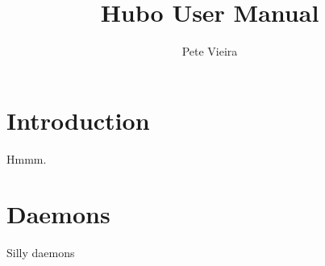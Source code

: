\documentclass[letterpaper, 10 pt]{report}
\begin{document}
\title{Hubo User Manual}
\author{Pete Vieira}
\maketitle
\pagestyle{empty}

\tableofcontents
\newpage

\section{Introduction}
Hmmm.
\newpage

\section{Daemons}
Silly daemons
\newpage
%

\end{document}
